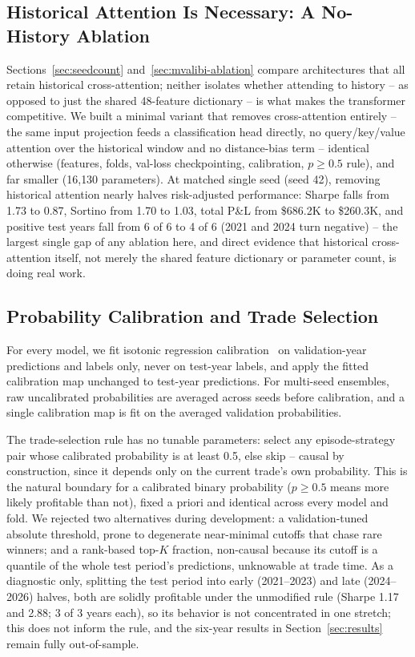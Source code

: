 \documentclass[sigconf,review]{acmart}
\begin{document}
\subsection{Historical Attention Is Necessary: A No-History Ablation}
\label{sec:nohistory}
Sections~\ref{sec:seedcount} and~\ref{sec:mvalibi-ablation} compare architectures that all retain historical cross-attention; neither isolates whether attending to history -- as opposed to just the shared 48-feature dictionary -- is what makes the transformer competitive. We built a minimal variant that removes cross-attention entirely -- the same input projection feeds a classification head directly, no query/key/value attention over the historical window and no distance-bias term -- identical otherwise (features, folds, val-loss checkpointing, calibration, $p\ge0.5$ rule), and far smaller (16{,}130 parameters). At matched single seed (seed 42), removing historical attention nearly halves risk-adjusted performance: Sharpe falls from 1.73 to 0.87, Sortino from 1.70 to 1.03, total P\&L from \$686.2K to \$260.3K, and positive test years fall from 6 of 6 to 4 of 6 (2021 and 2024 turn negative) -- the largest single gap of any ablation here, and direct evidence that historical cross-attention itself, not merely the shared feature dictionary or parameter count, is doing real work.

\subsection{Probability Calibration and Trade Selection}
\label{sec:calibration}
For every model, we fit isotonic regression calibration~\cite{zadrozny2002transforming} on validation-year predictions and labels only, never on test-year labels, and apply the fitted calibration map unchanged to test-year predictions. For multi-seed ensembles, raw uncalibrated probabilities are averaged across seeds before calibration, and a single calibration map is fit on the averaged validation probabilities.

The trade-selection rule has no tunable parameters: select any episode-strategy pair whose calibrated probability is at least 0.5, else skip -- causal by construction, since it depends only on the current trade's own probability. This is the natural boundary for a calibrated binary probability ($p\ge0.5$ means more likely profitable than not), fixed a priori and identical across every model and fold. We rejected two alternatives during development: a validation-tuned absolute threshold, prone to degenerate near-minimal cutoffs that chase rare winners; and a rank-based top-$K$ fraction, non-causal because its cutoff is a quantile of the whole test period's predictions, unknowable at trade time. As a diagnostic only, splitting the test period into early (2021--2023) and late (2024--2026) halves, both are solidly profitable under the unmodified rule (Sharpe 1.17 and 2.88; 3 of 3 years each), so its behavior is not concentrated in one stretch; this does not inform the rule, and the six-year results in Section~\ref{sec:results} remain fully out-of-sample.
\end{document}
